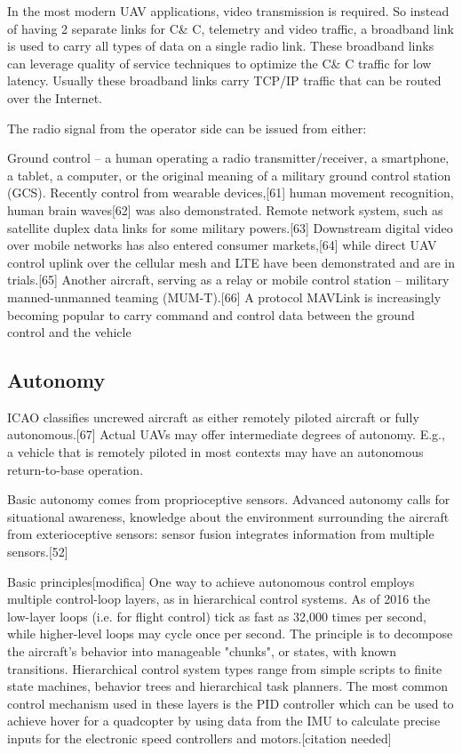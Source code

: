 In the most modern UAV applications, video transmission is required. So instead of having 2 separate links for C\& C, telemetry and video traffic, a broadband link is used to carry all types of data on a single radio link. These broadband links can leverage quality of service techniques to optimize the C\& C traffic for low latency. Usually these broadband links carry TCP/IP traffic that can be routed over the Internet.

The radio signal from the operator side can be issued from either:

Ground control – a human operating a radio transmitter/receiver, a smartphone, a tablet, a computer, or the original meaning of a military ground control station (GCS). Recently control from wearable devices,[61] human movement recognition, human brain waves[62] was also demonstrated.
Remote network system, such as satellite duplex data links for some military powers.[63] Downstream digital video over mobile networks has also entered consumer markets,[64] while direct UAV control uplink over the cellular mesh and LTE have been demonstrated and are in trials.[65]
Another aircraft, serving as a relay or mobile control station – military manned-unmanned teaming (MUM-T).[66]
A protocol MAVLink is increasingly becoming popular to carry command and control data between the ground control and the vehicle

\subsection{Autonomy}


ICAO classifies uncrewed aircraft as either remotely piloted aircraft or fully autonomous.[67] Actual UAVs may offer intermediate degrees of autonomy. E.g., a vehicle that is remotely piloted in most contexts may have an autonomous return-to-base operation.

Basic autonomy comes from proprioceptive sensors. Advanced autonomy calls for situational awareness, knowledge about the environment surrounding the aircraft from exterioceptive sensors: sensor fusion integrates information from multiple sensors.[52]

Basic principles[modifica]
One way to achieve autonomous control employs multiple control-loop layers, as in hierarchical control systems. As of 2016 the low-layer loops (i.e. for flight control) tick as fast as 32,000 times per second, while higher-level loops may cycle once per second. The principle is to decompose the aircraft's behavior into manageable "chunks", or states, with known transitions. Hierarchical control system types range from simple scripts to finite state machines, behavior trees and hierarchical task planners. The most common control mechanism used in these layers is the PID controller which can be used to achieve hover for a quadcopter by using data from the IMU to calculate precise inputs for the electronic speed controllers and motors.[citation needed]

